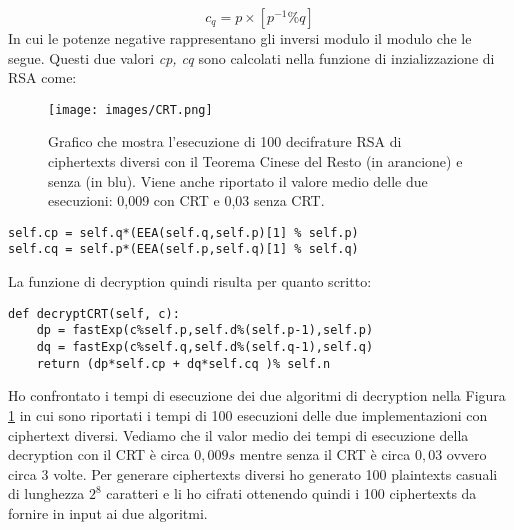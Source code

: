 \documentclass{article}
\begin{document}
\begin{enumerate}
\begin{itemize}
\begin{equation}
        \end{equation}
        \begin{equation}
            c_q = p \times [p^{-1} \% q]
        \end{equation}
        In cui le potenze negative rappresentano gli inversi modulo il modulo che le segue. Questi due valori \textit{cp, cq} sono calcolati nella funzione di inzializzazione di RSA come:
            \begin{figure}[t]
    \centering
    \texttt{[image: images/CRT.png]}
    \caption{Grafico che mostra l'esecuzione di 100 decifrature RSA di ciphertexts diversi con il Teorema Cinese del Resto (in arancione) e senza (in blu). Viene anche riportato il valore medio delle due esecuzioni: 0,009 con CRT e 0,03 senza CRT.}
    \label{fig:CRT}
    \end{figure}
        \begin{lstlisting}
self.cp = self.q*(EEA(self.q,self.p)[1] % self.p)
self.cq = self.p*(EEA(self.p,self.q)[1] % self.q)
        \end{lstlisting}
        La funzione di decryption quindi risulta per quanto scritto:
        \begin{lstlisting}
def decryptCRT(self, c):
    dp = fastExp(c%self.p,self.d%(self.p-1),self.p) 
    dq = fastExp(c%self.q,self.d%(self.q-1),self.q) 
    return (dp*self.cp + dq*self.cq )% self.n 
        \end{lstlisting}
    \end{itemize}
    Ho confrontato i tempi di esecuzione dei due algoritmi di decryption nella Figura \ref{fig:CRT} in cui sono riportati i tempi di 100 esecuzioni delle due implementazioni con ciphertext diversi. Vediamo che il valor medio dei tempi di esecuzione della decryption con il CRT è circa $0,009s$ mentre senza il CRT è circa $0,03$ ovvero circa 3 volte. Per generare ciphertexts diversi ho generato 100 plaintexts casuali di lunghezza $2^8$ caratteri e li ho cifrati ottenendo quindi i 100 ciphertexts da fornire in input ai due algoritmi.

\end{enumerate}
\end{document}
